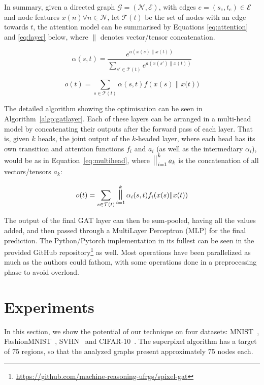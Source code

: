 \documentclass[twocolumn]{article}
\newcommand{\concat}[2]{\ensuremath{#1\|#2}}
\DeclareMathOperator*{\Concat}{\text{\Large $\|$} }
\begin{document}
In summary, given a directed graph $\mathcal{G} = (\mathcal{N}, \mathcal{E})$, with edges $e = (s_e,t_e) \in \mathcal{E}$ and node features $x(n) \forall n \in \mathcal{N}$, let $\mathcal{T}(t)$ be the set of nodes with an edge towards $t$, the attention model can be summarised by Equations \eqref{eq:attention} and \eqref{eq:layer} below, where $\|$ denotes vector/tensor concatenation.

\begin{equation}\label{eq:attention}
    \alpha(s,t) = \frac{e^{a(\concat{x(s)}{x(t)})}} {\sum_{s' \in \mathcal{T}(t)}{ e^{a(\concat{x(s')}{x(t)}) }} }
\end{equation}

\begin{equation}\label{eq:layer}
    o(t) = \sum_{s \in \mathcal{T}(t)} \alpha(s,t)f(\concat{x(s)}{x(t}))
\end{equation}

The detailed algorithm showing the optimisation can be seen in Algorithm~\ref{algo:gatlayer}. 
Each of these layers can be arranged in a multi-head model by concatenating their outputs after the forward pass of each layer. That is, given $k$ heads, the joint output of the $k$-headed layer, where each head has its own transition and attention functions $f_i$ and $a_i$ (as well as the intermediary $\alpha_i$), would be as in Equation~\eqref{eq:multihead}, where $\Concat_{i=1}^k a_k$ is the concatenation of all vectors/tensors $a_k$:

\begin{equation}\label{eq:multihead}
    o(t) = \sum_{s \in \mathcal{T}(t)} \Concat_{i = 1}^k  \alpha_i(s,t)f_i(\concat{x(s)}{x(t)})
\end{equation}

The output of the final GAT layer can then be sum-pooled, having all the values added, and then passed through a MultiLayer Perceptron (MLP) for the final prediction. The Python/Pytorch implementation in its fullest can be seen in the provided GitHub repository\footnote{\url{https://github.com/machine-reasoning-ufrgs/spixel-gat}} as well. Most operations have been parallelized as much as the authors could fathom, with some operations done in a preprocessing phase to avoid overload. 

\section{Experiments}\label{sec:experiments}

In this section, we show 
the potential of our technique on
four datasets: MNIST~\cite{lecun1998mnist}, FashionMNIST~\cite{xiao2017fashionmnist}, SVHN~\cite{netzer2011svhn} and CIFAR-10~\cite{krizhevsky2009cifar}. The superpixel algorithm has a target of 75 regions, so that the analyzed graphs present approximately 75 nodes each. 
\end{document}
